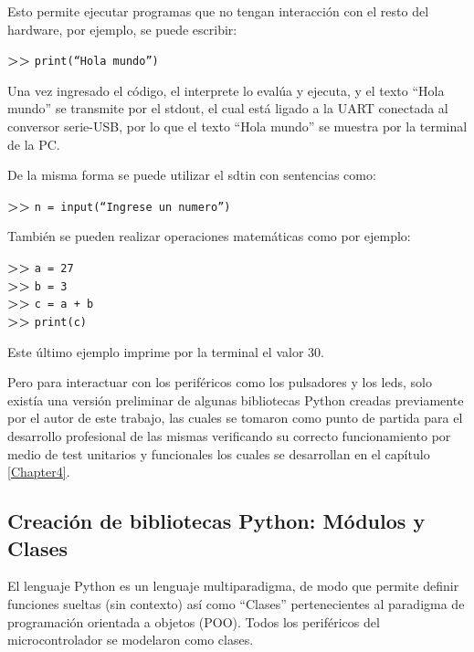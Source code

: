 Esto permite ejecutar programas que no tengan interacción con el resto del hardware, por ejemplo, se puede escribir:

\textbf{{\fontsize{16}{16}\selectfont \textgreater\textgreater}} \texttt{print(“Hola mundo”)}

Una vez ingresado el código, el interprete lo evalúa y ejecuta, y el texto “Hola mundo” se transmite por el stdout, el cual está ligado a la UART conectada al conversor serie-USB, por lo que el texto “Hola mundo” se muestra por la terminal de la PC.

De la misma forma se puede utilizar el sdtin con sentencias como:

\textbf{{\fontsize{16}{16}\selectfont \textgreater\textgreater}} \texttt{n = input(“Ingrese un numero”)}

También se pueden realizar operaciones matemáticas como por ejemplo:

\textbf{{\fontsize{16}{16}\selectfont \textgreater\textgreater}} \texttt{a = 27}\\
\textbf{{\fontsize{16}{16}\selectfont \textgreater\textgreater}} \texttt{b = 3}\\
\textbf{{\fontsize{16}{16}\selectfont \textgreater\textgreater}} \texttt{c = a + b}\\
\textbf{{\fontsize{16}{16}\selectfont \textgreater\textgreater}} \texttt{print(c)}

Este último ejemplo imprime por la terminal el valor 30.

Pero para interactuar con los periféricos como los pulsadores y los leds, solo existía una versión preliminar de algunas bibliotecas Python creadas previamente por el autor de este trabajo, las cuales se tomaron como punto de partida para el desarrollo profesional de las mismas verificando su correcto funcionamiento por medio de test unitarios y funcionales los cuales se desarrollan en el capítulo \ref{Chapter4}.


\subsection{Creación de bibliotecas Python: Módulos y Clases} 

El lenguaje Python es un lenguaje multiparadigma, de modo que permite definir funciones sueltas (sin contexto) así como “Clases” pertenecientes al paradigma de programación orientada a objetos (POO). Todos los periféricos del microcontrolador se modelaron como clases.

